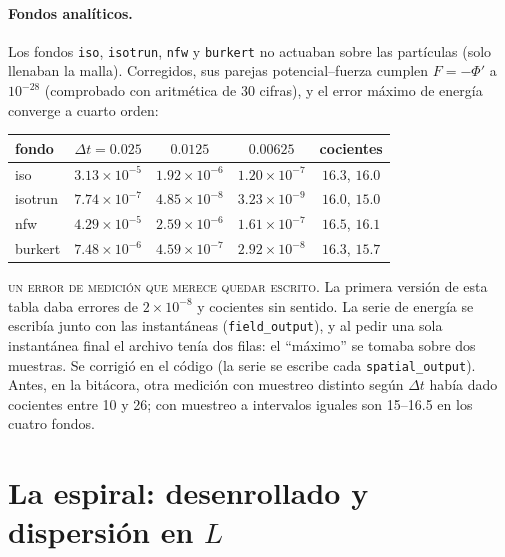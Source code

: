 \documentclass[11pt,a4paper]{article}
\begin{document}
\paragraph{Fondos analíticos.} Los fondos \texttt{iso}, \texttt{isotrun}, \texttt{nfw} y
\texttt{burkert} no actuaban sobre las partículas (solo llenaban la malla). Corregidos,
sus parejas potencial--fuerza cumplen $F=-\Phi'$ a $10^{-28}$ (comprobado con aritmética
de 30 cifras), y el error máximo de energía converge a cuarto orden:

\begin{center}
\begin{tabular}{lcccc}
\toprule
fondo & $\Delta t=0.025$ & $0.0125$ & $0.00625$ & cocientes \\
\midrule
iso     & $3.13\times10^{-5}$ & $1.92\times10^{-6}$ & $1.20\times10^{-7}$ & $16.3$, $16.0$ \\
isotrun & $7.74\times10^{-7}$ & $4.85\times10^{-8}$ & $3.23\times10^{-9}$ & $16.0$, $15.0$ \\
nfw     & $4.29\times10^{-5}$ & $2.59\times10^{-6}$ & $1.61\times10^{-7}$ & $16.5$, $16.1$ \\
burkert & $7.48\times10^{-6}$ & $4.59\times10^{-7}$ & $2.92\times10^{-8}$ & $16.3$, $15.7$ \\
\bottomrule
\end{tabular}
\end{center}

\begin{aviso}
\textsc{un error de medición que merece quedar escrito.} La primera versión de esta tabla
daba errores de $2\times10^{-8}$ y cocientes sin sentido. La serie de energía se
escribía junto con las instantáneas (\texttt{field\_output}), y al pedir una sola
instantánea final el archivo tenía dos filas: el ``máximo'' se tomaba sobre dos muestras.
Se corrigió en el código (la serie se escribe cada \texttt{spatial\_output}). Antes, en la
bitácora, otra medición con muestreo distinto según $\Delta t$ había dado cocientes entre
10 y 26; con muestreo a intervalos iguales son 15--16.5 en los cuatro fondos.
\end{aviso}

\section{La espiral: desenrollado y dispersión en \texorpdfstring{$L$}{L}}
\label{sec:espiral}
\end{document}
